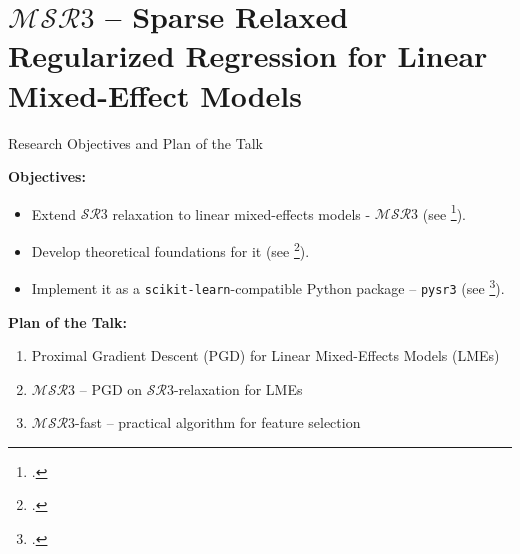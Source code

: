 \documentclass[8pt]{beamer}
\begin{document}
\section{$\mathcal{MSR}3$ -- Sparse Relaxed Regularized Regression for Linear Mixed-Effect Models}

\begin{frame}{Research Objectives and Plan of the Talk}
	
\textbf{Objectives:}
\begin{itemize}
	\item Extend $\mathcal{SR}3$ relaxation to linear mixed-effects models - $\mathcal{MSR}3$ (see \footcite{sholokhov2022relaxation}).
	\item Develop theoretical foundations for it (see \footcite{aravkin2022jimtheory}).
	\item Implement it as a \texttt{scikit-learn}-compatible Python package -- \texttt{pysr3} (see \footcite{sholokhov2023pysr3}).
\end{itemize}

\vspace{3em}

\textbf{Plan of the Talk:}
\begin{enumerate}
	\item Proximal Gradient Descent (PGD) for Linear Mixed-Effects Models (LMEs)
	\item $\mathcal{MSR}3$ --  PGD on $\mathcal{SR}3$-relaxation for LMEs
	\item $\mathcal{MSR}3$-fast -- practical algorithm for feature selection
\end{enumerate}
\end{frame}
\end{document}
